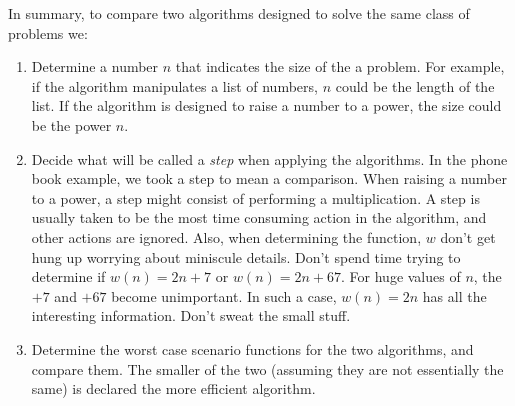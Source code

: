 In summary, to compare two algorithms designed to solve the same
class of problems we: 
\begin{enumerate}
 \item Determine a number $n$ that indicates the size of the a problem.
 For example, if the algorithm manipulates a list of numbers, $n$
 could be the length of the list.  If the algorithm is designed to
 raise a number to a power, the size could be the power $n$.
 
 \item Decide what will be called a {\itshape step} when applying the
 algorithms. In the phone book example, we took a step to mean a 
 comparison. When raising a number to a power, a step might
 consist of performing a multiplication. A step is usually taken
 to be the most time consuming action in the algorithm, and
 other actions are ignored. Also, when determining the function,
 $w$ don't get hung up worrying about miniscule details. Don't
 spend time trying to determine if $w(n) = 2n+7$ or $w(n) = 2n + 67$.
 For huge values of $n$, the $+7$ and $+67$ become unimportant.
 In such a case, $w(n) =2n$ has all the interesting information.
 Don't sweat the small stuff.
 
 \item Determine the worst case scenario functions for the two algorithms,
 and compare them. The smaller of the two (assuming they are not
 essentially the same) is declared the more efficient algorithm.
\end{enumerate}

